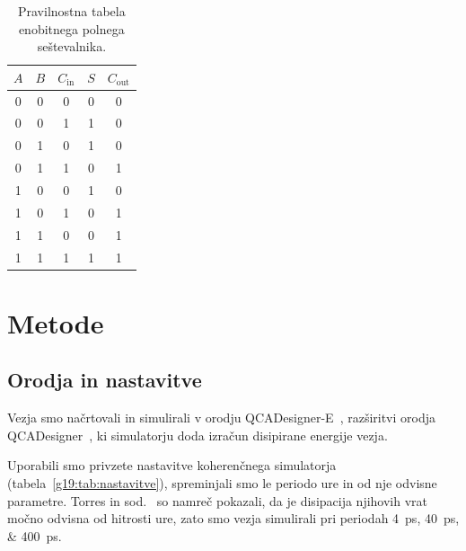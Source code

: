 \begin{table}[H]
\centering
\caption{Pravilnostna tabela enobitnega polnega seštevalnika.}
\label{g19:tab:polni-sestevalnik}
\begin{tabular}{ccc|cc}
\hline
$A$ & $B$ & $C_\mathrm{in}$ & $S$ & $C_\mathrm{out}$ \\
\hline
0 & 0 & 0 & 0 & 0 \\
0 & 0 & 1 & 1 & 0 \\
0 & 1 & 0 & 1 & 0 \\
0 & 1 & 1 & 0 & 1 \\
1 & 0 & 0 & 1 & 0 \\
1 & 0 & 1 & 0 & 1 \\
1 & 1 & 0 & 0 & 1 \\
1 & 1 & 1 & 1 & 1 \\
\hline
\end{tabular}
\end{table}

\section{Metode}
\label{g19:sec:metode}

\subsection{Orodja in nastavitve}
\label{g19:sec:orodja}

Vezja smo načrtovali in simulirali v orodju QCADesigner-E~\cite{silltorres2018}, razširitvi orodja QCADesigner~\cite{walus2004}, ki simulatorju doda izračun disipirane energije vezja.

Uporabili smo privzete nastavitve koherenčnega simulatorja (tabela~\ref{g19:tab:nastavitve}), spreminjali smo le periodo ure in od nje odvisne parametre. Torres in sod.~\cite{g19:torres2019} so namreč pokazali, da je disipacija njihovih vrat močno odvisna od hitrosti ure, zato smo vezja simulirali pri periodah \SIlist{4;40;400}{\pico\second}.


